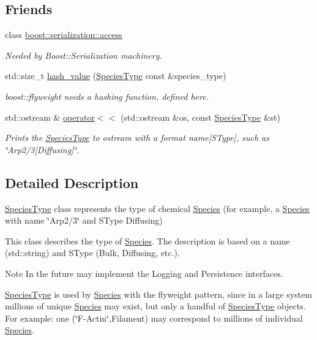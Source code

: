 \subsection*{Friends}
\begin{DoxyCompactItemize}
\item 
class \hyperlink{classchem_1_1SpeciesType_ac98d07dd8f7b70e16ccb9a01abf56b9c}{boost\-::serialization\-::access}
\begin{DoxyCompactList}\small\item\em Needed by Boost\-::\-Serialization machinery. \end{DoxyCompactList}\item 
std\-::size\-\_\-t \hyperlink{classchem_1_1SpeciesType_ad48f13e05211225475379004632c68f2}{hash\-\_\-value} (\hyperlink{classchem_1_1SpeciesType}{Species\-Type} const \&species\-\_\-type)
\begin{DoxyCompactList}\small\item\em boost\-::flyweight needs a hashing function, defined here. \end{DoxyCompactList}\item 
std\-::ostream \& \hyperlink{classchem_1_1SpeciesType_ac1c8f22ef84ed673f047ea7aec48d064}{operator$<$$<$} (std\-::ostream \&os, const \hyperlink{classchem_1_1SpeciesType}{Species\-Type} \&st)
\begin{DoxyCompactList}\small\item\em Prints the \hyperlink{classchem_1_1SpeciesType}{Species\-Type} to ostream with a format name\mbox{[}S\-Type\mbox{]}, such as \char`\"{}\-Arp2/3\mbox{[}\-Diffusing\mbox{]}\char`\"{}. \end{DoxyCompactList}\end{DoxyCompactItemize}


\subsection{Detailed Description}
\hyperlink{classchem_1_1SpeciesType}{Species\-Type} class represents the type of chemical \hyperlink{classchem_1_1Species}{Species} (for example, a \hyperlink{classchem_1_1Species}{Species} with name \char`\"{}\-Arp2/3\char`\"{} and S\-Type Diffusing) 

This class describes the type of \hyperlink{classchem_1_1Species}{Species}. The description is based on a name (std\-::string) and S\-Type (Bulk, Diffusing, etc.). \begin{DoxyNote}{Note}
In the future may implement the Logging and Persistence interfaces. 

\hyperlink{classchem_1_1SpeciesType}{Species\-Type} is used by \hyperlink{classchem_1_1Species}{Species} with the flyweight pattern, since in a large system millions of unique \hyperlink{classchem_1_1Species}{Species} may exist, but only a handful of \hyperlink{classchem_1_1SpeciesType}{Species\-Type} objects. For example\-: one (\char`\"{}\-F-\/\-Actin\char`\"{},Filament) may correspond to millions of individual \hyperlink{classchem_1_1Species}{Species}. 
\end{DoxyNote}


